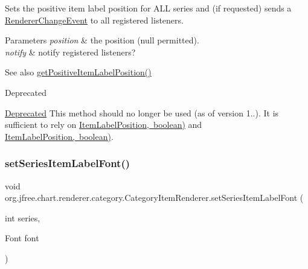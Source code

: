 Sets the positive item label position for A\+LL series and (if requested) sends a \mbox{\hyperlink{}{Renderer\+Change\+Event}} to all registered listeners.


\begin{DoxyParams}{Parameters}
{\em position} & the position ({\ttfamily null} permitted). \\
\hline
{\em notify} & notify registered listeners?\\
\hline
\end{DoxyParams}
\begin{DoxySeeAlso}{See also}
\mbox{\hyperlink{interfaceorg_1_1jfree_1_1chart_1_1renderer_1_1category_1_1_category_item_renderer_a7638a57b47286a431b6f48b756b32ebc}{get\+Positive\+Item\+Label\+Position()}}
\end{DoxySeeAlso}
\begin{DoxyRefDesc}{Deprecated}
\item[\mbox{\hyperlink{deprecated__deprecated000176}{Deprecated}}]This method should no longer be used (as of version 1..). It is sufficient to rely on \mbox{\hyperlink{}{Item\+Label\+Position, boolean)}} and \mbox{\hyperlink{}{Item\+Label\+Position, boolean)}}. \end{DoxyRefDesc}
\mbox{\label{interfaceorg_1_1jfree_1_1chart_1_1renderer_1_1category_1_1_category_item_renderer_a6db6cbca30485a625bac7dec9e6e00a0}} 
\subsubsection{\texorpdfstring{set\+Series\+Item\+Label\+Font()}{setSeriesItemLabelFont()}}
{\footnotesize\ttfamily void org.\+jfree.\+chart.\+renderer.\+category.\+Category\+Item\+Renderer.\+set\+Series\+Item\+Label\+Font (\begin{DoxyParamCaption}\item[{int}]{series,  }\item[{Font}]{font }\end{DoxyParamCaption})}

